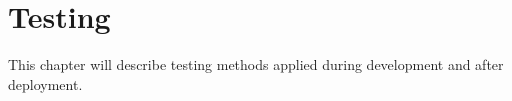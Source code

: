 
\chapter{Testing}\label{ch:testing}

This chapter will describe testing methods applied during development and after deployment.




